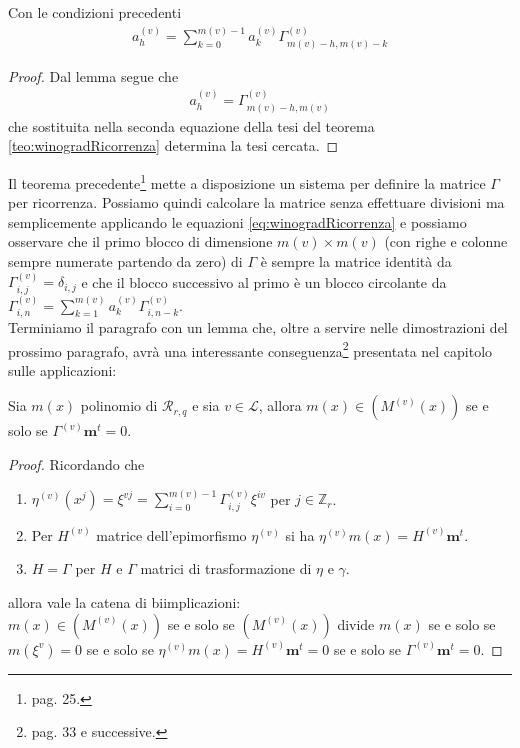 \begin{corollario}
   Con le condizioni precedenti
   \begin{align} 
      a_{h}^{(v)} = \sum_{k=0}^{m(v)-1} a_{k}^{(v)} \Gamma_{m(v) - h, m(v) - k}^{(v)}
   \end{align}
\end{corollario}
\begin{proof}
   Dal lemma segue che
   \begin{align*}
      a_{h}^{(v)} = \Gamma_{m(v) - h, m(v)}^{(v)}
   \end{align*}
   che sostituita nella seconda equazione della tesi del teorema \ref{teo:winogradRicorrenza} determina la tesi cercata.
\end{proof}
\noindent
Il teorema precedente\footnote{\cite{cerruti} pag. 25.} mette a disposizione un sistema per definire la matrice $\Gamma$ per ricorrenza. Possiamo quindi calcolare la matrice senza effettuare divisioni ma semplicemente applicando le equazioni \ref{eq:winogradRicorrenza} e possiamo osservare che il primo blocco di dimensione $m(v) \times m(v)$ (con righe e colonne sempre numerate partendo da zero) di $\Gamma$ è sempre la matrice identità da $\Gamma_{i,j}^{(v)} = \delta_{i,j}$ e che il blocco successivo al primo è un blocco circolante da $\Gamma_{i,n}^{(v)} = \sum_{k=1}^{m(v)} a_{k}^{(v)} \Gamma_{i,n-k}^{(v)} $. \\
Terminiamo il paragrafo con un lemma che, oltre a servire nelle dimostrazioni del prossimo paragrafo, avrà una interessante conseguenza\footnote{\cite{cerruti} pag. 33 e successive.} presentata nel capitolo sulle applicazioni:
\begin{lemmax} \label{le:codiciEdGamma}
   Sia $m(x)$ polinomio di $\mathcal{R}_{r,q}$ e sia $v \in \mathscr{L}$, allora $m(x) \in (M^{(v)}(x))$ se e solo se $\Gamma^{(v)} \mathbf{m}^{t} = 0$.
\end{lemmax}
\begin{proof}
   Ricordando che
   \begin{enumerate}
      \item $\eta^{(v)}(x^{j}) = \xi^{vj} = \sum_{i=0}^{m(v)-1}\Gamma_{i,j}^{(v)}\xi^{iv}$ per $j \in \mathbb{Z}_{r}$.
      \item Per $H^{(v)}$ matrice dell'epimorfismo $\eta^{(v)}$ si ha $\eta^{(v)}m(x) = H^{(v)}\mathbf{m}^{t}$.
      \item $H=\Gamma$ per $H$ e $\Gamma$ matrici di trasformazione di $\eta$ e $\gamma$.
   \end{enumerate}
   allora vale la catena di biimplicazioni:\\
   $m(x)\in (M^{(v)}(x))$ se e solo se $(M^{(v)}(x))$ divide $m(x)$ se e solo se $m(\xi^{v}) = 0$ se e solo se $\eta^{(v)}m(x) = H^{(v)}\mathbf{m}^{t} = 0$ se e solo se $ \Gamma^{(v)}\mathbf{m}^{t} = 0$.
\end{proof}

